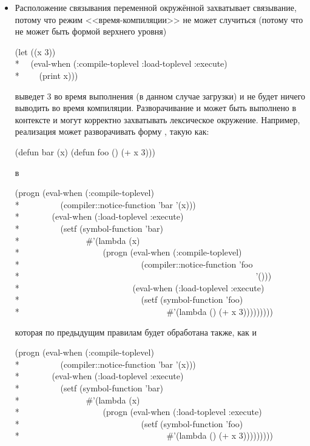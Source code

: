 \begin{defspec}
\begin{itemize}
\item Расположение связывания переменной окружённой 
  захватывает связывание, потому что режим <<время-компиляции>> не может
  случиться (потому что  не может быть формой верхнего уровня)
  \begin{lisp}
    (let ((x 3)) \\*
    ~~(eval-when (:compile-toplevel :load-toplevel :execute) \\*
    ~~~~(print x)))
  \end{lisp}
  выведет 3 во время выполнения (в данном случае загрузки) и не будет ничего
  выводить во время компиляции. Разворачивание  и  может
  быть выполнено в контексте  и могут корректно захватывать
  лексическое окружение.
  Например, реализация может разворачивать форму , такую как:
  \begin{lisp}
    (defun bar (x) (defun foo () (+ x 3)))
  \end{lisp}
  в
  \begin{lisp}
    (progn (eval-when (:compile-toplevel) \\*
    ~~~~~~~~~(compiler::notice-function 'bar '(x))) \\*
    ~~~~~~~(eval-when (:load-toplevel :execute) \\*
    ~~~~~~~~~(setf (symbol-function 'bar) \\*
    ~~~~~~~~~~~~~~~\#'(lambda (x) \\*
    ~~~~~~~~~~~~~~~~~~~(progn (eval-when (:compile-toplevel)  \\*
    ~~~~~~~~~~~~~~~~~~~~~~~~~~~~(compiler::notice-function 'foo \\*
    ~~~~~~~~~~~~~~~~~~~~~~~~~~~~~~~~~~~~~~~~~~~~~~~~~~~~~~~'())) \\*
    ~~~~~~~~~~~~~~~~~~~~~~~~~~(eval-when (:load-toplevel :execute) \\*
    ~~~~~~~~~~~~~~~~~~~~~~~~~~~~(setf (symbol-function 'foo) \\*
    ~~~~~~~~~~~~~~~~~~~~~~~~~~~~~~~~~~\#'(lambda () (+ x 3)))))))))
  \end{lisp}
  которая по предыдущим правилам будет обработана также, как и 
  \begin{lisp}
    (progn (eval-when (:compile-toplevel) \\*
    ~~~~~~~~~(compiler::notice-function 'bar '(x))) \\*
    ~~~~~~~(eval-when (:load-toplevel :execute) \\*
    ~~~~~~~~~(setf (symbol-function 'bar) \\*
    ~~~~~~~~~~~~~~~\#'(lambda (x) \\*
    ~~~~~~~~~~~~~~~~~~~(progn (eval-when (:load-toplevel :execute) \\*
    ~~~~~~~~~~~~~~~~~~~~~~~~~~~~(setf (symbol-function 'foo) \\*
    ~~~~~~~~~~~~~~~~~~~~~~~~~~~~~~~~~~\#'(lambda () (+ x 3)))))))))
  \end{lisp}


\end{itemize}
\end{defspec}
